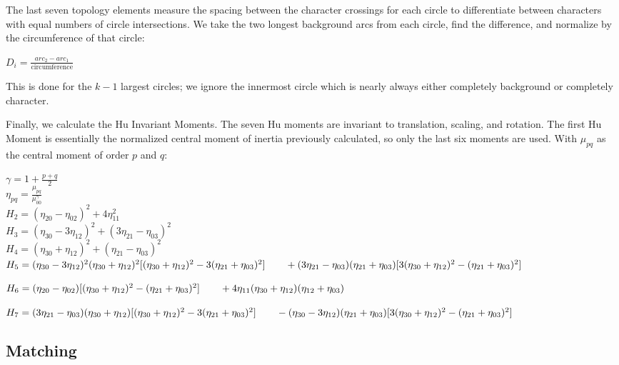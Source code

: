 \documentclass[journal]{IEEEtran}
\begin{document}
The last seven topology elements measure the spacing between the character crossings for each circle to differentiate between characters with equal numbers of circle intersections. We take the two longest background arcs from each circle, find the difference, and normalize by the circumference of that circle:
\begin{center}
    $
    D_i = \frac{arc_2-arc_1}{\text{circumference}}
    $
\end{center}

This is done for the $k-1$ largest circles; we ignore the innermost circle which is nearly always either completely background or completely character.

Finally, we calculate the Hu Invariant Moments\cite{Muralidharan:article_typical}. The seven Hu moments are invariant to translation, scaling, and rotation\cite{Hu:article_typical}. The first Hu Moment is essentially the normalized central moment of inertia previously calculated, so only the last six moments are used. With $\mu_{pq}$ as the central moment of order $p$ and $q$:
\begin{minipage}{\columnwidth}
    \(\gamma=1+\frac{p+q}{2}\)\\
    \(\eta_{pq}=\frac{\mu_{pq}}{\mu_{00}^{\gamma}}\)\\
    \( H_2=(\eta_{20}-\eta_{02})^2 +4\eta_{11}^2 \)\\    
    \(H_3=(\eta_{30}-3\eta_{12})^2 +(3\eta_{21}-\eta_{03})^2\)\\    
    \(H_4=(\eta_{30}+\eta_{12})^2 +(\eta_{21}-\eta_{03})^2\)\\    
    \(H_5=(\eta_{30}-3\eta_{12})^2 (\eta_{30}+\eta_{12})^2[(\eta_{30}+\eta_{12})^2-3(\eta_{21}+\eta_{03})^2]\\
        \text{\qquad}+(3\eta_{21}-\eta_{03})(\eta_{21}+\eta_{03})[3(\eta_{30}+\eta_{12})^2-(\eta_{21}+\eta_{03})^2] \)
    
    \(H_6=(\eta_{20}-\eta_{02})[(\eta_{30}+\eta_{12})^2-(\eta_{21}+\eta_{03})^2]\\
    \text{\qquad}+4\eta_{11}(\eta_{30}+\eta_{12})(\eta_{12}+\eta_{03}) \)
    
    \(H_7=(3\eta_{21}-\eta_{03})(\eta_{30}+\eta_{12})[(\eta_{30}+\eta_{12})^2-3(\eta_{21}+\eta_{03})^2]\\ \text{\qquad}-(\eta_{30}-3\eta_{12})(\eta_{21}+\eta_{03})[3(\eta_{30}+\eta_{12})^2-(\eta_{21}+\eta_{03})^2]\)
\end{minipage}

\subsection{Matching}
\end{document}
